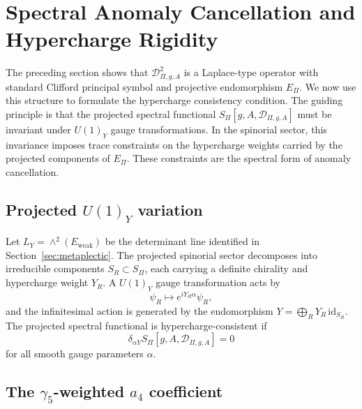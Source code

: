 \documentclass[11pt,a4paper]{article}
\theoremstyle{definition}
\theoremstyle{remark}
\begin{document}
  \section{Spectral Anomaly Cancellation and Hypercharge Rigidity}
  \label{sec:anomaly}

  The preceding section shows that $\mathcal{D}_{\Pi,g,A}^2$ is a Laplace-type
  operator with standard Clifford principal symbol and projective endomorphism $E_\Pi$.
  We now use this structure to formulate the hypercharge consistency condition.
  The guiding principle is that the projected spectral functional
  $S_\Pi[g, A, \mathcal{D}_{\Pi,g,A}]$ must be invariant under $U(1)_Y$ gauge
  transformations.
  In the spinorial sector, this invariance imposes trace constraints on the
  hypercharge weights carried by the projected components of $E_\Pi$.
  These constraints are the spectral form of anomaly cancellation.

  \subsection{Projected \texorpdfstring{$U(1)_Y$}{U(1)\_Y} variation}
    \label{ssec:u1-variation}

    Let $L_Y = \wedge^2(E_{\mathrm{weak}})$ be the determinant line identified in
    Section~\ref{sec:metaplectic}.
    The projected spinorial sector decomposes into irreducible components
    $S_R \subset S_\Pi$, each carrying a definite chirality and hypercharge weight
    $Y_R$.
    A $U(1)_Y$ gauge transformation acts by
    \begin{equation}
      \label{eq:u1-action}
      \psi_R \longmapsto e^{i Y_R \alpha} \psi_R ,
    \end{equation}
    and the infinitesimal action is generated by the endomorphism
    $Y = \bigoplus_R Y_R \, \mathrm{id}_{S_R}$.
    The projected spectral functional is hypercharge-consistent if
    \begin{equation}
      \label{eq:u1-invariance}
      \delta_{\alpha Y} S_\Pi[g, A, \mathcal{D}_{\Pi,g,A}] = 0
    \end{equation}
    for all smooth gauge parameters $\alpha$.

  \subsection{The \texorpdfstring{$\gamma_5$-weighted $a_4$}{gamma5-weighted a4}
  coefficient}
    \label{ssec:gamma5-a4}
\end{document}
